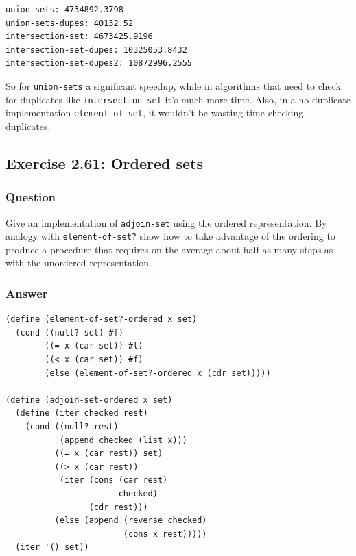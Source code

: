 \documentclass[final,fleqn,titlepage,twoside]{article}
\begin{document}
\begin{verbatim}
union-sets: 4734892.3798
union-sets-dupes: 40132.52
intersection-set: 4673425.9196
intersection-set-dupes: 10325053.8432
intersection-set-dupes2: 10872996.2555
\end{verbatim}

So for \texttt{union-sets} a significant speedup, while in algorithms that
need to check for duplicates like \texttt{intersection-set} it's much more
time. Also, in a no-duplicate implementation \texttt{element-of-set}, it
wouldn't be wasting time checking duplicates.

\subsection{Exercise 2.61: Ordered sets}
\label{sec:org860db92}
\subsubsection{Question}
\label{sec:org2dd2978}
Give an implementation of \texttt{adjoin-set} using the ordered
representation. By analogy with \texttt{element-of-set?} show how to take
advantage of the ordering to produce a procedure that requires on the average
about half as many steps as with the unordered representation.

\subsubsection{Answer}
\label{sec:orgbc53879}
\begin{verbatim}
(define (element-of-set?-ordered x set)
  (cond ((null? set) #f)
        ((= x (car set)) #t)
        ((< x (car set)) #f)
        (else (element-of-set?-ordered x (cdr set)))))

(define (adjoin-set-ordered x set)
  (define (iter checked rest)
    (cond ((null? rest)
           (append checked (list x)))
          ((= x (car rest)) set)
          ((> x (car rest))
           (iter (cons (car rest)
                       checked)
                 (cdr rest)))
          (else (append (reverse checked)
                        (cons x rest)))))
  (iter '() set))
\end{verbatim}
\end{document}
